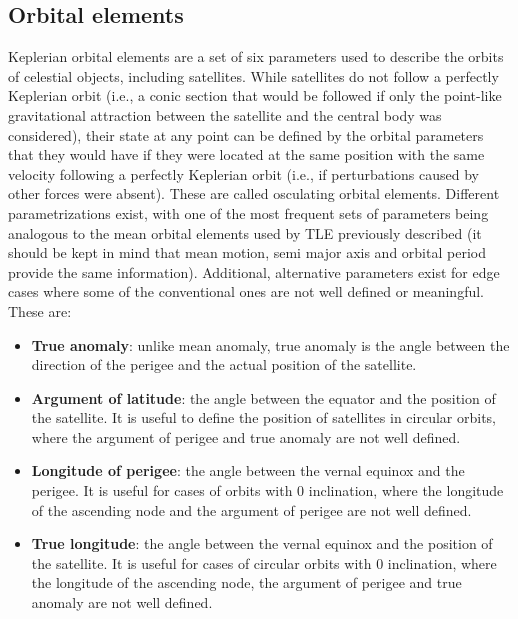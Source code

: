 \hypertarget{orbital-elements}{%
\subsection{Orbital elements}\label{orbital-elements}}

Keplerian orbital elements are a set of six parameters used to describe the orbits of celestial objects, including satellites. While satellites do not follow a perfectly Keplerian orbit (i.e., a conic section that would be followed if only the point-like gravitational attraction between the satellite and the central body was considered), their state at any point can be defined by the orbital parameters that they would have if they were located at the same
position with the same velocity following a perfectly Keplerian orbit (i.e., if perturbations caused by other forces were absent). These are called osculating orbital elements. Different parametrizations exist, with one of the most frequent sets of parameters being analogous to the mean orbital elements used by TLE previously described (it should be kept in mind that mean motion, semi major axis and orbital period provide the same information). Additional, alternative parameters exist for edge cases where some of the conventional ones are not well defined or meaningful. These are:

\begin{itemize}
\tightlist
\item
  \textbf{True anomaly}: unlike mean anomaly, true anomaly is the angle between the direction of the perigee and the actual position of the satellite.
\item
  \textbf{Argument of latitude}: the angle between the equator and the position of the satellite. It is useful to define the position of satellites in circular orbits, where the argument of perigee and true anomaly are not well defined.
\item
  \textbf{Longitude of perigee}: the angle between the vernal equinox and the perigee. It is useful for cases of orbits with 0 inclination, where the longitude of the ascending node and the argument of perigee are not well defined.
\item
  \textbf{True longitude}: the angle between the vernal equinox and the position of the satellite. It is useful for cases of circular orbits with 0 inclination, where the longitude of the ascending node, the argument of perigee and true anomaly are not well defined.
\end{itemize}

